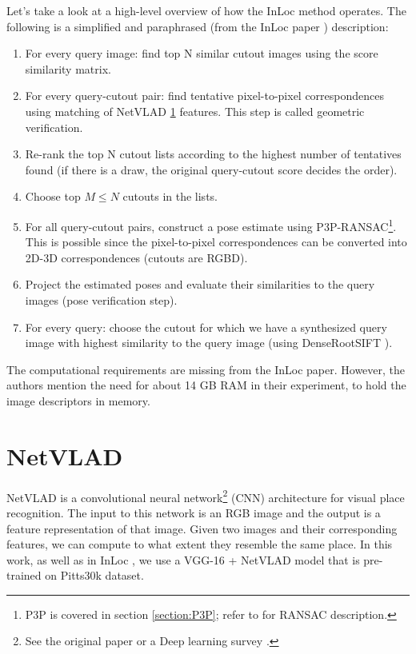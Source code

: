 \documentclass[twoside]{ctuthesis}
\theoremstyle{plain}
\theoremstyle{definition}
\theoremstyle{note}
\newcommand{\code}[1]{{\ttfamily #1%
}}
\begin{document}
Let's take a look at a high-level overview of how the InLoc method operates. The following is a simplified and paraphrased (from the InLoc paper \cite{taira2018inloc}) description:

\begin{enumerate}
	\item For every query image: find top N similar cutout images using the \code{score} similarity matrix.
	\item For every query-cutout pair: find tentative pixel-to-pixel correspondences using matching of NetVLAD \ref{section:NetVLAD} features. This step is called geometric verification.
	\item Re-rank the top N cutout lists according to the highest number of tentatives found (if there is a draw, the original query-cutout score decides the order).
	\item Choose top $M \le N$ cutouts in the lists.
	\item For all query-cutout pairs, construct a pose estimate using P3P-RANSAC\footnote{P3P is covered in section \ref{section:P3P}; refer to \cite{RANSAC} for RANSAC description.}. This is possible since the pixel-to-pixel correspondences can be converted into 2D-3D correspondences (cutouts are RGBD).
	\item Project the estimated poses and evaluate their similarities to the query images (pose verification step).
	\item For every query: choose the cutout for which we have a synthesized query image with highest similarity to the query image (using DenseRootSIFT \cite{RootSIFT} \cite{DenseSIFT}).
\end{enumerate}

The computational requirements are missing from the InLoc paper. However, the authors mention the need for about 14 GB RAM in their experiment, to hold the image descriptors in memory.

\section{NetVLAD}
\label{section:NetVLAD}
NetVLAD \cite{Arandjelovic16} is a convolutional neural network\footnote{See the original paper \cite{CNN} or a Deep learning survey \cite{DeepLearning}.} (CNN) architecture for visual place recognition. The input to this network is an RGB image and the output is a feature representation of that image. Given two images and their corresponding features, we can compute to what extent they resemble the same place. In this work, as well as in InLoc \cite{taira2018inloc}, we use a VGG-16 \cite{VGG} + NetVLAD model that is pre-trained on Pitts30k \cite{Arandjelovic16} dataset.
\end{document}

